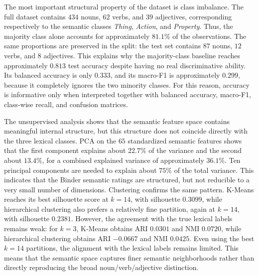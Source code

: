 \documentclass{ipgpmaster}
\begin{document}
The most important structural property of the dataset is class imbalance. The full dataset contains \(434\) nouns, \(62\) verbs, and \(39\) adjectives, corresponding respectively to the semantic classes \emph{Thing}, \emph{Action}, and \emph{Property}. Thus, the majority class alone accounts for approximately \(81.1\%\) of the observations. The same proportions are preserved in the split: the test set contains \(87\) nouns, \(12\) verbs, and \(8\) adjectives. This explains why the majority-class baseline reaches approximately \(0.813\) test accuracy despite having no real discriminative ability. Its balanced accuracy is only \(0.333\), and its macro-F1 is approximately \(0.299\), because it completely ignores the two minority classes. For this reason, accuracy is informative only when interpreted together with balanced accuracy, macro-F1, class-wise recall, and confusion matrices.

The unsupervised analysis shows that the semantic feature space contains meaningful internal structure, but this structure does not coincide directly with the three lexical classes. PCA on the \(65\) standardized semantic features shows that the first component explains about \(22.7\%\) of the variance and the second about \(13.4\%\), for a combined explained variance of approximately \(36.1\%\). Ten principal components are needed to explain about \(75\%\) of the total variance. This indicates that the Binder semantic ratings are structured, but not reducible to a very small number of dimensions. Clustering confirms the same pattern. K-Means reaches its best silhouette score at \(k=14\), with silhouette \(0.3099\), while hierarchical clustering also prefers a relatively fine partition, again at \(k=14\), with silhouette \(0.2381\). However, the agreement with the true lexical labels remains weak: for \(k=3\), K-Means obtains ARI \(0.0301\) and NMI \(0.0720\), while hierarchical clustering obtains ARI \(-0.0667\) and NMI \(0.0425\). Even using the best \(k=14\) partitions, the alignment with the lexical labels remains limited. This means that the semantic space captures finer semantic neighborhoods rather than directly reproducing the broad noun/verb/adjective distinction.
\end{document}
